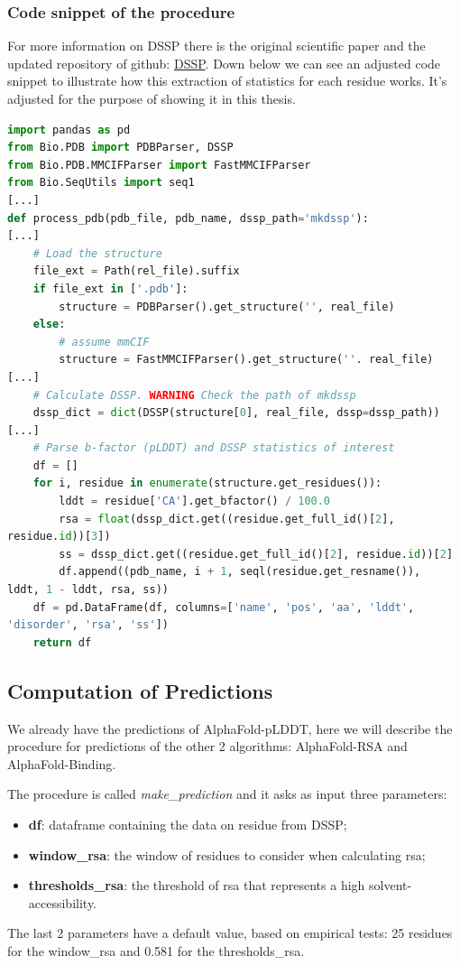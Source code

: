 \subsubsection{Code snippet of the procedure}
For more information on DSSP there is the original scientific paper \cite{og-dssp} and the updated repository of github: \hyperlink{https://github.com/PDB-REDO/dssp}{DSSP}.
Down below we can see an adjusted code snippet to illustrate how this extraction of statistics for each residue works. It's adjusted for the purpose of showing it in this thesis.

\vspace{2em}

\begin{lstlisting}[language=Python, caption=Extraction\ residues'\ statistics, label={code:processpdb}]
import pandas as pd
from Bio.PDB import PDBParser, DSSP
from Bio.PDB.MMCIFParser import FastMMCIFParser
from Bio.SeqUtils import seq1
[...]
def process_pdb(pdb_file, pdb_name, dssp_path='mkdssp'):
[...]
    # Load the structure
    file_ext = Path(rel_file).suffix
    if file_ext in ['.pdb']:
        structure = PDBParser().get_structure('', real_file)
    else:
        # assume mmCIF
        structure = FastMMCIFParser().get_structure(''. real_file)
[...]
    # Calculate DSSP. WARNING Check the path of mkdssp
    dssp_dict = dict(DSSP(structure[0], real_file, dssp=dssp_path))
[...]
    # Parse b-factor (pLDDT) and DSSP statistics of interest
    df = []
    for i, residue in enumerate(structure.get_residues()):
        lddt = residue['CA'].get_bfactor() / 100.0
        rsa = float(dssp_dict.get((residue.get_full_id()[2], 
residue.id))[3])
        ss = dssp_dict.get((residue.get_full_id()[2], residue.id))[2]
        df.append((pdb_name, i + 1, seql(residue.get_resname()), 
lddt, 1 - lddt, rsa, ss))
    df = pd.DataFrame(df, columns=['name', 'pos', 'aa', 'lddt', 
'disorder', 'rsa', 'ss'])
    return df
\end{lstlisting}

\subsection{Computation of Predictions}
We already have the predictions of AlphaFold-pLDDT, here we will describe the procedure for predictions of the other 2 algorithms: AlphaFold-RSA and AlphaFold-Binding.

The procedure is called \textit{make\_prediction} and it asks as input three parameters:
\begin{itemize}
    \item \textbf{df}: dataframe containing the data on residue from DSSP;
    \item \textbf{window\_rsa}: the window of residues to consider when calculating rsa;
    \item \textbf{thresholds\_rsa}: the threshold of rsa that represents a high solvent-accessibility.
\end{itemize}
The last 2 parameters have a default value, based on empirical tests: 25 residues for the window\_rsa and 0.581 for the thresholds\_rsa.

